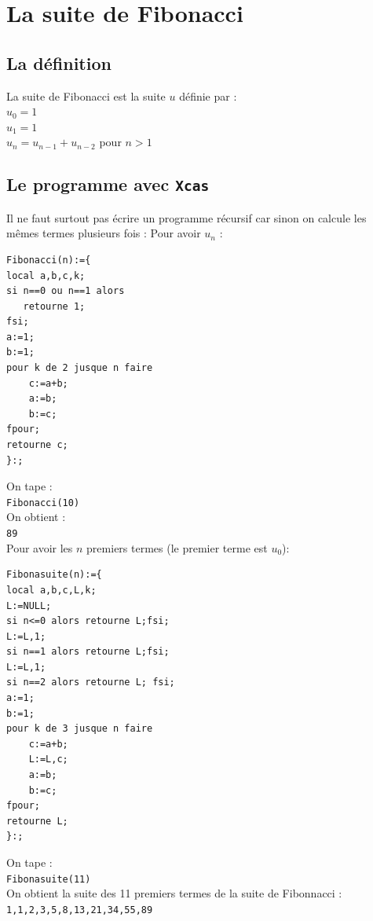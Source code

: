 \documentclass[a4paper,11pt]{book}
\begin{document}
\section{La suite de Fibonacci}
\subsection{La d\'efinition}
La suite de Fibonacci est la suite $u$ d\'efinie par :\\
$u_0=1$\\
$u_1=1$\\
$u_n=u_{n-1}+u_{n-2}$ pour $n>1$
\subsection{Le programme avec {\tt Xcas}}
Il ne faut surtout pas \'ecrire un programme r\'ecursif car sinon on calcule 
les m\^emes termes plusieurs fois :
Pour avoir $u_n$ :
\begin{verbatim}
Fibonacci(n):={
local a,b,c,k;
si n==0 ou n==1 alors
   retourne 1;
fsi;
a:=1;
b:=1;
pour k de 2 jusque n faire
    c:=a+b;
    a:=b;
    b:=c;
fpour;
retourne c;   
}:;
\end{verbatim}
On tape :\\
{\tt Fibonacci(10)}\\
On obtient :\\
{\tt 89}\\
Pour avoir les $n$ premiers termes (le premier terme est $u_0$):
\begin{verbatim}
Fibonasuite(n):={
local a,b,c,L,k;
L:=NULL;
si n<=0 alors retourne L;fsi;
L:=L,1;
si n==1 alors retourne L;fsi;
L:=L,1;
si n==2 alors retourne L; fsi;
a:=1;
b:=1;
pour k de 3 jusque n faire
    c:=a+b;
    L:=L,c;
    a:=b;
    b:=c;
fpour;
retourne L;   
}:;
\end{verbatim}
On tape :\\
{\tt Fibonasuite(11)}\\
On obtient la suite des 11 premiers termes de la suite de Fibonnacci :\\
{\tt 1,1,2,3,5,8,13,21,34,55,89}
\end{document}

